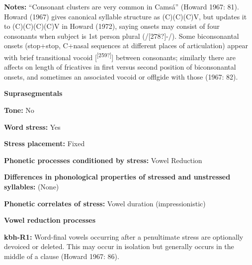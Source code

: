 \begin{styleBody}
\textbf{Notes: }“Consonant clusters are very common in Camsá” (Howard 1967: 81). Howard (1967) gives canonical syllable structure as (C)(C)(C)V, but updates it to (C)(C)(C)(C)V in Howard (1972), saying onsets may consist of four consonants when subject is 1st person plural (/[278?]{}-/). Some biconsonantal onsets (stop+stop, C+nasal sequences at different places of articulation) appear with brief transitional vocoid [\textsuperscript{[259?]}] between consonants; similarly there are affects on length of fricatives in first versus second position of biconsonantal onsets, and sometimes an associated vocoid or offlgide with those (1967: 82).
\end{styleBody}

\begin{styleBody}
\textbf{Suprasegmentals}
\end{styleBody}

\begin{styleBody}
\textbf{Tone:} No
\end{styleBody}

\begin{styleBody}
\textbf{Word stress:} Yes
\end{styleBody}

\begin{styleBody}
\textbf{Stress placement:} Fixed
\end{styleBody}

\begin{styleBody}
\textbf{Phonetic processes conditioned by stress:} Vowel Reduction
\end{styleBody}

\begin{styleBody}
\textbf{Differences in phonological properties of stressed and unstressed syllables:} (None)
\end{styleBody}

\begin{styleBody}
\textbf{Phonetic correlates of stress: }Vowel duration (impressionistic)
\end{styleBody}

\begin{styleBody}
\textbf{Vowel reduction processes}
\end{styleBody}

\begin{styleBody}
\textbf{kbh-R1:} Word-final vowels occurring after a penultimate stress are optionally devoiced or deleted. This may occur in isolation but generally occurs in the middle of a clause (Howard 1967: 86).
\end{styleBody}

